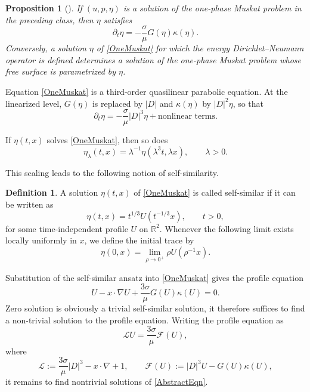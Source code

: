 \documentclass[12pt]{amsart}
\newtheorem{proposition}[theorem]{Proposition}
\theoremstyle{remark}
\theoremstyle{definition}
\newtheorem{definition}[theorem]{Definition}
\numberwithin{equation}{section}
\newcommand{\R}{\mathbb{R}}
\begin{document}
\begin{proposition}[\hspace{1sp}\cite{MR4131404}]
If \((u,p,\eta)\) is a solution of the one-phase Muskat problem in the preceding class, then \(\eta\) satisfies
\begin{equation} \label{OneMuskat}
 \partial_t\eta=-\frac{\sigma}{\mu}G(\eta)\kappa(\eta).
\end{equation}
Conversely, a solution \(\eta\) of \eqref{OneMuskat} for which the energy Dirichlet--Neumann operator is defined determines a solution of the one-phase Muskat problem whose free surface is parametrized by \(\eta\).
\end{proposition}

Equation \eqref{OneMuskat} is a third-order quasilinear parabolic equation.
At the linearized level, \(G(\eta)\) is replaced by \(|D|\) and
\(\kappa(\eta)\) by \(|D|^2\eta\), so that
\begin{equation*}
 \partial_t\eta=-\frac{\sigma}{\mu}|D|^3\eta+\text{nonlinear terms}.
\end{equation*}

If \(\eta(t,x)\) solves \eqref{OneMuskat}, then so does
\begin{equation*}
 \eta_\lambda(t,x)=\lambda^{-1}\eta(\lambda^3t,\lambda x), \qquad \lambda>0.
\end{equation*}

This scaling leads to the following notion of self-similarity.
\begin{definition}
A solution \(\eta(t,x)\) of \eqref{OneMuskat} is called self-similar if it can be written as
\begin{equation*}
 \eta(t,x)=t^{1/3}U\left(t^{-1/3}x\right), \qquad t>0,
\end{equation*}
for some time-independent profile \(U\) on \(\R^2\).
Whenever the following limit exists locally uniformly in \(x\), we define the initial trace by
\begin{equation*}
 \eta(0,x)=\lim_{\rho\to0^+}\rho U\left(\rho^{-1}x\right).
\end{equation*}
\end{definition}

Substitution of the self-similar ansatz into \eqref{OneMuskat} gives the profile equation
\begin{equation*}
 U-x\cdot\nabla U+\frac{3\sigma}{\mu}G(U)\kappa(U)=0.
\end{equation*}
Zero solution is obviously a trivial self-similar solution, it therefore suffices to find a non-trivial solution to the profile equation.  
Writing the profile equation as
\begin{equation} \label{AbstractEqn}
 \mathcal LU=\frac{3\sigma}{\mu}\mathscr F(U),
\end{equation}
where
\begin{equation} \label{LFDef}
 \mathcal L:=\frac{3\sigma}{\mu}|D|^3-x\cdot\nabla+1, \qquad \mathscr F(U):=|D|^3U-G(U)\kappa(U),
\end{equation}
it remains to find nontrivial solutions of \eqref{AbstractEqn}.
\end{document}
